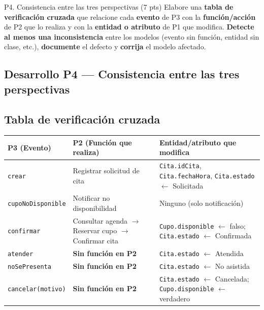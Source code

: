 \documentclass[11pt,a4paper,oneside]{article}
\begin{document}
\begin{tarea}{P4. Consistencia entre las tres perspectivas \hfill (7 pts)}
Elabore una \textbf{tabla de verificaci\'on cruzada} que relacione cada \textbf{evento} de P3 con la \textbf{funci\'on/acci\'on} de P2 que lo realiza y con la \textbf{entidad o atributo} de P1 que modifica. \textbf{Detecte al menos una inconsistencia} entre los modelos (evento sin funci\'on, entidad sin clase, etc.), \textbf{documente} el defecto y \textbf{corrija} el modelo afectado.
\end{tarea}


\subsection*{Desarrollo P4 --- Consistencia entre las tres perspectivas}

\subsection*{Tabla de verificación cruzada}

\begin{center}
{\footnotesize
\begin{tabularx}{\textwidth}{@{}L{3.3cm}>{\raggedright\arraybackslash}X>{\raggedright\arraybackslash}X@{}}
\toprule
\textbf{P3 (Evento)} & \textbf{P2 (Función que realiza)} &
\textbf{Entidad/atributo que modifica} \\ \midrule
\texttt{crear} & Registrar solicitud de cita & \texttt{Cita.idCita}, \texttt{Cita.fechaHora},
\texttt{Cita.estado} $\leftarrow$ Solicitada \\ \addlinespace
\texttt{cupoNoDisponible} & Notificar no disponibilidad & Ninguno (solo notificación) \\ \addlinespace
\texttt{confirmar} & Consultar agenda $\rightarrow$ Reservar cupo $\rightarrow$ Confirmar cita &
\texttt{Cupo.disponible} $\leftarrow$ falso; \texttt{Cita.estado} $\leftarrow$ Confirmada \\ \addlinespace
\texttt{atender} & \textbf{Sin función en P2} & \texttt{Cita.estado} $\leftarrow$ Atendida \\ \addlinespace
\texttt{noSePresenta} & \textbf{Sin función en P2} & \texttt{Cita.estado} $\leftarrow$ No asistida \\ \addlinespace
\texttt{cancelar(motivo)} & \textbf{Sin función en P2} & \texttt{Cita.estado} $\leftarrow$
Cancelada; \texttt{Cupo.disponible} $\leftarrow$ verdadero \\ \bottomrule
\end{tabularx}}
\end{center}
\end{document}
